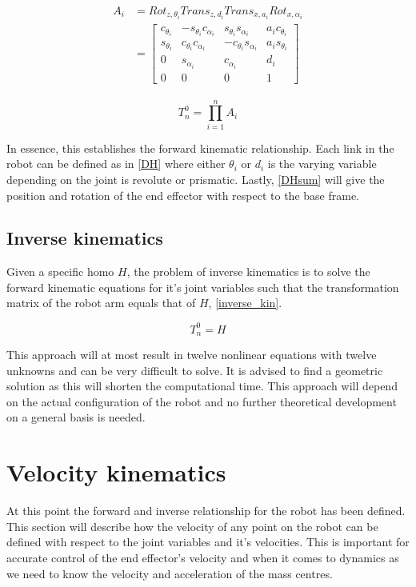 \begin{align}\label{DH}
\begin{split}
A_i &= Rot_{z,\theta_i}Trans_{z,d_i}Trans_{x,a_i}Rot_{x,\alpha_i} \\
&= \begin{bmatrix}
c_{\theta_i} & -s_{\theta_i}c_{\alpha_i} & s_{\theta_i}s_{\alpha_i} & a_{i}c_{\theta_i} \\ 
s_{\theta_i} & c_{\theta_i}c_{\alpha_i} & -c_{\theta_i}s_{\alpha_i} & a_{i}s_{\theta_i} \\ 
0 & s_{\alpha_i} & c_{\alpha_i} & d_i \\ 
0 & 0 & 0 & 1 
\end{bmatrix}
\end{split}
\end{align}

\begin{equation}\label{DHsum}
T^0_n=\prod_{i=1}^{n}A_i
\end{equation}

In essence, this establishes the forward kinematic relationship. Each link in the robot can be defined as in \eqref{DH} where either $\theta_i$ or $d_i$ is the varying variable depending on the joint is revolute or prismatic. Lastly, \eqref{DHsum} will give the position and rotation of the end effector with respect to the base frame.

\subsection{Inverse kinematics}

Given a specific \gls{homo} $H$, the problem of inverse kinematics is to solve the forward kinematic equations for it's joint variables such that the transformation matrix of the robot arm equals that of $H$, \eqref{inverse_kin}.

\begin{equation}\label{inverse_kin}
T^0_n = H
\end{equation}

This approach will at most result in twelve nonlinear equations with twelve unknowns and can be very difficult to solve. It is advised to find a geometric solution as this will shorten the computational  time. This approach will depend on the actual configuration of the robot and no further theoretical development on a general basis is needed.

\section{Velocity kinematics}
At this point the forward and inverse relationship for the robot has been defined. This section will describe how the velocity of any point on the robot can be defined with respect to the joint variables and it's velocities. This is important for accurate control of the end effector's velocity and when it comes to 
dynamics as we need to know the velocity and acceleration of the mass centres.
